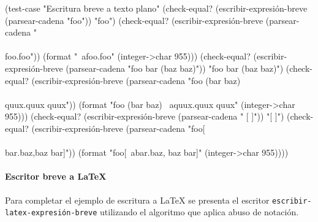 \documentclass[10pt,oneside,openany,letterpaper]{book}
\begin{document}
\nwenddocs{}\plusendmoddef
(test-case "Escritura breve a texto plano"
  (check-equal? (escribir-expresión-breve (parsear-cadena "foo"))
                "foo")
  (check-equal? (escribir-expresión-breve (parsear-cadena "\\\\foo.foo"))
                (format "~afoo.foo" (integer->char 955)))
  (check-equal? (escribir-expresión-breve
                 (parsear-cadena "foo bar (baz baz)"))
                "foo bar (baz baz)")
  (check-equal? (escribir-expresión-breve
                 (parsear-cadena "foo (bar baz) \\\\quux.quux quux"))
                (format "foo (bar baz) ~aquux.quux quux" (integer->char 955)))
  (check-equal? (escribir-expresión-breve (parsear-cadena " [    ]"))
                "[ ]")
  (check-equal? (escribir-expresión-breve
                 (parsear-cadena "foo[\\\\bar.baz,baz bar]"))
                (format "foo[~abar.baz, baz bar]" (integer->char 955))))
\nwendcode{}\nwdocspar

\paragraph{Escritor breve a \LaTeX{}} Para completar el ejemplo de escritura a \LaTeX{} se presenta el escritor {\tt{}\protect{}escribir-latex-expresión-breve} utilizando el algoritmo que aplica abuso de notación.
\end{document}
